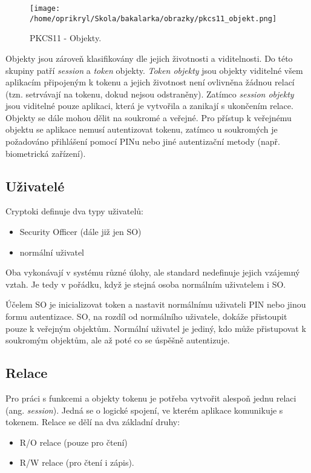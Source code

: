 \documentclass[]{fithesis3}
\begin{document}
		\begin{figure}[!ht]
  			\begin{minipage}{1.00\textwidth}
    				\texttt{[image: /home/oprikryl/Skola/bakalarka/obrazky/pkcs11\_objekt.png]}
  			\end{minipage}
 			\caption{PKCS11 - Objekty.}
  			\label{fig:PKCS11 - Objekty.}
		\end{figure}

		Objekty jsou zároveň klasifikovány dle jejich životnosti a viditelnosti. Do této skupiny patří 			\textit{session} a \textit{token} objekty. \textit{Token objekty} jsou objekty viditelné všem 			aplikacím připojeným k tokenu a jejich životnost není ovlivněna žádnou relací (tzn. 					setrvávají na tokenu, dokud nejsou odstraněny). Zatímco \textit{session objekty} jsou 				viditelné pouze aplikaci, která je vytvořila a zanikají s ukončením relace.
		Objekty se dále mohou dělit na soukromé a veřejné. Pro přístup k veřejnému objektu se 			aplikace nemusí autentizovat tokenu, zatímco u soukromých je požadováno přihlášení 				pomocí PINu nebo jiné autentizační metody (např. biometrická zařízení).

		\newpage
		\subsection{Uživatelé}

		Cryptoki definuje dva typy uživatelů: 
		\begin{itemize}
			\item Security Officer (dále již jen SO) 
			\item normální uživatel
		\end{itemize}
		Oba vykonávají v systému různé úlohy, ale standard nedefinuje jejich vzájemný vztah. Je 			tedy v pořádku, když je stejná osoba normálním uživatelem i SO.

		Účelem SO je inicializovat token a nastavit normálnímu uživateli PIN nebo jinou formu 				autentizace. SO, na rozdíl od normálního uživatele, dokáže přistoupit pouze k veřejným 			objektům.
		Normální uživatel je jediný, kdo může přistupovat k soukromým objektům, ale až poté co	
		se úspěšně autentizuje. 

		\subsection{Relace}

		Pro práci s funkcemi a objekty tokenu je potřeba vytvořit alespoň jednu relaci (ang. 				\textit{session}). Jedná se o logické spojení, ve kterém aplikace komunikuje s tokenem. 			Relace se dělí na dva základní druhy:
		\begin{itemize}
			\item R/O relace (pouze pro čtení) 
			\item R/W relace (pro čtení i zápis).
		\end{itemize}
\end{document}
